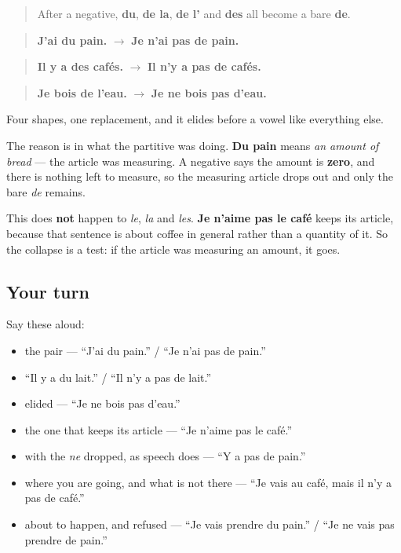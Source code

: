 \begin{cousinweb}
\begin{quote}
After a negative, \textbf{du}, \textbf{de la}, \textbf{de l'} and \textbf{des} all become a bare \textbf{de}.
\end{quote}

\begin{quote}
\textbf{J'ai du pain.} $\to$ \textbf{Je n'ai pas de pain.}
\end{quote}

\begin{quote}
\textbf{Il y a des cafés.} $\to$ \textbf{Il n'y a pas de cafés.}
\end{quote}

\begin{quote}
\textbf{Je bois de l'eau.} $\to$ \textbf{Je ne bois pas d'eau.}
\end{quote}

Four shapes, one replacement, and it elides before a vowel like everything else.

The reason is in what the partitive was doing. \textbf{Du pain} means \emph{an amount of bread} — the article was measuring. A negative says the amount is \textbf{zero}, and there is nothing left to measure, so the measuring article drops out and only the bare \emph{de} remains.

This does \textbf{not} happen to \emph{le}, \emph{la} and \emph{les}. \textbf{Je n'aime pas le café} keeps its article, because that sentence is about coffee in general rather than a quantity of it. So the collapse is a test: if the article was measuring an amount, it goes.
\end{cousinweb}

\subsection*{Your turn}
Say these aloud:

\begin{itemize}
\raggedright
  \item the pair — \textquotedblleft{}J'ai du pain.\textquotedblright{} / \textquotedblleft{}Je n'ai pas de pain.\textquotedblright{}
  \item \textquotedblleft{}Il y a du lait.\textquotedblright{} / \textquotedblleft{}Il n'y a pas de lait.\textquotedblright{}
  \item elided — \textquotedblleft{}Je ne bois pas d'eau.\textquotedblright{}
  \item the one that keeps its article — \textquotedblleft{}Je n'aime pas le café.\textquotedblright{}
  \item with the \emph{ne} dropped, as speech does — \textquotedblleft{}Y a pas de pain.\textquotedblright{}
  \item where you are going, and what is not there — \textquotedblleft{}Je vais au café, mais il n'y a pas de café.\textquotedblright{}
  \item about to happen, and refused — \textquotedblleft{}Je vais prendre du pain.\textquotedblright{} / \textquotedblleft{}Je ne vais pas prendre de pain.\textquotedblright{}
\end{itemize}

